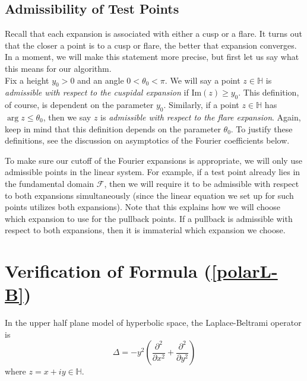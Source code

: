 \documentclass[]{article}
\begin{document}
\subsection*{Admissibility of Test Points}

Recall that each expansion is associated with either a cusp or a flare.
It turns out that the closer a point is to a cusp or flare, the better that expansion converges.
In a moment, we will make this statement more precise, but first let us say what this means for our algorithm.
\\

Fix a height $y_0 > 0$ and an angle $0 < \theta_0 < \pi$.
We will say a point $z \in \mathbb{H}$ is \textit{admissible with respect to the cuspidal expansion} if $\text{Im}(z) \geq y_0$.
This definition, of course, is dependent on the parameter $y_0$.
Similarly, if a point $z \in \mathbb{H}$ has $\arg z \leq \theta_0$, then we say $z$ is \textit{admissible with respect to the flare expansion}.
Again, keep in mind that this definition depends on the parameter $\theta_0$.
To justify these definitions, see the discussion on asymptotics of the Fourier coefficients below.

To make sure our cutoff of the Fourier expansions is appropriate, we will only use admissible points in the linear system.
For example, if a test point already lies in the fundamental domain $\mathcal{F}$, then we will require it to be admissible with respect to both expansions simultaneously (since the linear equation we set up for such points utilizes both expansions).
Note that this explains how we will choose which expansion to use for the pullback points.
If a pullback is admissible with respect to both expansions, then it is immaterial which expansion we choose.

\section*{Verification of Formula (\ref{polarL-B})}

In the upper half plane model of hyperbolic space, the Laplace-Beltrami operator is
$$
\Delta = -y^2\left( \frac{\partial^2}{\partial x^2} + \frac{\partial^2}{\partial y^2} \right)
$$
where $z = x + iy \in \mathbb{H}$.
\\
\end{document}
